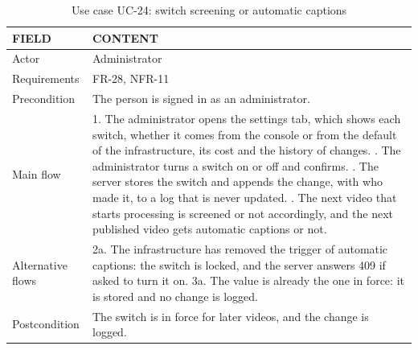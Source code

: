 \begin{table}[H]
\centering
\caption{Use case UC-24: switch screening or automatic captions}
\label{tab:uc-switches}
\small
\begin{tabularx}{\textwidth}{p{} X}
\toprule
\textbf{FIELD} & \textbf{CONTENT} \\
\midrule
Actor & Administrator \\
Requirements & FR-28, NFR-11 \\
Precondition & The person is signed in as an administrator. \\
Main flow &
  1. The administrator opens the settings tab, which shows each switch, whether it comes from the console or from the default of the infrastructure, its cost and the history of changes. \newline
  2. The administrator turns a switch on or off and confirms. \newline
  3. The server stores the switch and appends the change, with who made it, to a log that is never updated. \newline
  4. The next video that starts processing is screened or not accordingly, and the next published video gets automatic captions or not. \\
Alternative flows &
  2a. The infrastructure has removed the trigger of automatic captions: the switch is locked, and the server answers 409 if asked to turn it on. \newline
  3a. The value is already the one in force: it is stored and no change is logged. \\
Postcondition & The switch is in force for later videos, and the change is logged. \\
\bottomrule
\end{tabularx}
\end{table}
